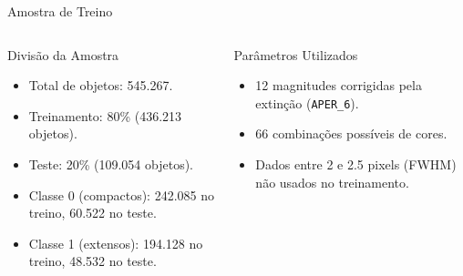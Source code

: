 \begin{frame}[c]{Amostra de Treino}
    \begin{columns}[c]
        \begin{column}{0.48\textwidth}
            \begin{splusbox}{Divisão da Amostra}
                \begin{itemize}
                    \item Total de objetos: 545.267.
                    \item Treinamento: 80\% (436.213 objetos).
                    \item Teste: 20\% (109.054 objetos).
                    \item Classe 0 (compactos): 242.085 no treino, 60.522 no teste.
                    \item Classe 1 (extensos): 194.128 no treino, 48.532 no teste.
                \end{itemize}
            \end{splusbox}
        \end{column}
        \begin{column}{0.48\textwidth}
            \begin{splusbox}{Parâmetros Utilizados}
                \begin{itemize}
                    \item 12 magnitudes corrigidas pela extinção (\texttt{APER\_6}).
                    \item 66 combinações possíveis de cores.
                    \item Dados entre 2 e 2.5 pixels (FWHM) não usados no treinamento.
                \end{itemize}
            \end{splusbox}
        \end{column}
    \end{columns}
\end{frame}

